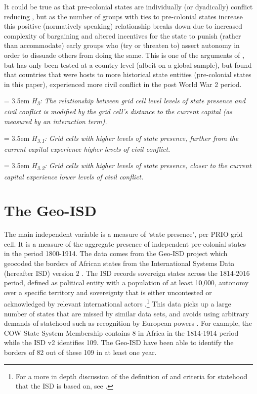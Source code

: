\documentclass[12pt]{article}
\begin{document}
It could be true as that pre-colonial states are individually (or dyadically)
conflict reducing \citep{Pinker2012, Wig2016}, but as the number of groups with
ties to pre-colonial states increase this positive (normatively speaking)
relationship breaks down due to increased complexity of bargaining
\citep{Walter2009} and altered incentives for the state to punish (rather than
accommodate) early groups who (try or threaten to) assert autonomy in order to
dissuade others from doing the same. This is one of the arguments of
\citet{Wishman}, but has only been tested at a country level (albeit on a global
sample), but found that countries that were hosts to more historical state
entities (pre-colonial states in this paper), experienced more civil conflict in
the post World War 2 period. 

\bigskip

\hangindent = 3.5em \textit{H\textsubscript{3}: The relationship between grid
cell level levels of state presence and civil conflict is modified by the grid
cell's distance to the current capital (as measured by an interaction term).}

\bigskip

\hangindent = 3.5em \textit{H\textsubscript{3.1}: Grid cells with higher levels of
state presence, further from the current capital experience higher levels of
civil conflict.}

\bigskip

\hangindent = 3.5em \textit{H\textsubscript{3.2}: Grid cells with higher
levels of state presence, closer to the current capital experience lower levels
of civil conflict.} 

\bigskip

\section{The Geo-ISD}

The main independent variable is a measure of `state presence', per PRIO grid
cell. It is a measure of the aggregate presence of independent pre-colonial
states in the period 1800-1914. The data comes from the Geo-ISD project which
geocoded the borders of African states from the International Systems Data
(hereafter ISD) version 2 \citep{Butcher2020}. The ISD records sovereign states
across the 1814-2016 period, defined as political entity with a population of at
least 10,000, autonomy over a specific territory and sovereignty that is either
uncontested or acknowledged by relevant international actors
\citep{Butcher2020}.\footnote{For a more in depth discussion of the definition
	of and criteria for statehood that the ISD is based on, see
\citet{Butcher2017}.} This data picks up a large number of states that are
missed by similar data sets, and avoids using arbitrary demands of statehood
such as recognition by European powers \citep{Butcher2020}.  For example, the
COW State System Membership contains 8 in Africa in the 1814-1914 period while
the ISD v2 identifies 109. The Geo-ISD have been able to identify the borders
of 82 out of these 109 in at least one year.
\end{document}
